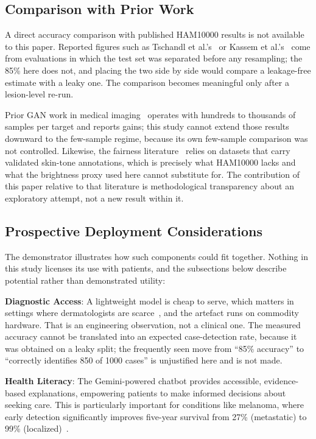 \documentclass[ai,article,submit,pdftex,moreauthors]{Definitions/mdpi}
\begin{document}
\subsection{Comparison with Prior Work}

A direct accuracy comparison with published HAM10000 results is not available to this paper. Reported figures such as Tschandl et al.'s~\cite{tschandl2018} or Kassem et al.'s~\cite{kassem2020} come from evaluations in which the test set was separated before any resampling; the 85\% here does not, and placing the two side by side would compare a leakage-free estimate with a leaky one. The comparison becomes meaningful only after a lesion-level re-run.

Prior GAN work in medical imaging~\cite{frid2018, shaban2019} operates with hundreds to thousands of samples per target and reports gains; this study cannot extend those results downward to the few-sample regime, because its own few-sample comparison was not controlled. Likewise, the fairness literature~\cite{daneshjou2022, kinyanjui2020} relies on datasets that carry validated skin-tone annotations, which is precisely what HAM10000 lacks and what the brightness proxy used here cannot substitute for. The contribution of this paper relative to that literature is methodological transparency about an exploratory attempt, not a new result within it.

\subsection{Prospective Deployment Considerations}

The demonstrator illustrates how such components could fit together. Nothing in this study licenses its use with patients, and the subsections below describe potential rather than demonstrated utility:

\textbf{Diagnostic Access}: A lightweight model is cheap to serve, which matters in settings where dermatologists are scarce~\cite{who2020}, and the artefact runs on commodity hardware. That is an engineering observation, not a clinical one. The measured accuracy cannot be translated into an expected case-detection rate, because it was obtained on a leaky split; the frequently seen move from ``85\% accuracy'' to ``correctly identifies 850 of 1000 cases'' is unjustified here and is not made.

\textbf{Health Literacy}: The Gemini-powered chatbot provides accessible, evidence-based explanations, empowering patients to make informed decisions about seeking care. This is particularly important for conditions like melanoma, where early detection significantly improves five-year survival from 27\% (metastatic) to 99\% (localized)~\cite{siegel2023}.
\end{document}
